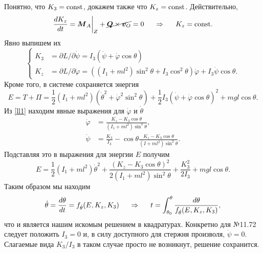 Понятно, что $K_3 = \text{const}$, докажем также что $K_z = \text{const}$. Действительно,
\begin{equation*}
    \frac{d K_z}{d t} = {\mbox{\boldmath $M$}_A}\bigg|_Z + \cancel{\mbox{\boldmath $Q$} \times \mbox{\boldmath $v$}_O} = 0
    \hspace{0.5cm} \Rightarrow \hspace{0.5cm} 
    K_z = \text{const}.
\end{equation*}
Явно выпишем их
\begin{equation}
\label{ll1}
    \left\{\begin{aligned}
        K_3 &= {\partial L}/{\partial \dot{\psi}} = I_3\left(\dot{\psi} + \dot{\varphi} \cos \theta\right) \\
        K_z &= {\partial L}/{\partial \dot{\varphi}} = 
        \left((I_1+ml^2) \sin^2 \theta + I_3 \cos^2 \theta\right) \dot{\varphi} + I_3 \dot{\psi} \cos \theta.
    \end{aligned}\right.
\end{equation}
Кроме того, в системе сохраняется энергия
\begin{equation*}
    E = T + \Pi = \frac{1}{2} (I_1 + ml^2) \left(\dot{\theta}^2+\dot{\varphi}^2 \sin^2 \theta\right) 
    + \frac{1}{2} I_3 \left(\dot{\psi} + \dot{\varphi} \cos \theta\right)^2 + mgl\cos \theta.
\end{equation*}
Из \eqref{ll1} находим явные выражения для $\dot{\varphi}$ и $\dot{\theta}$ 
\begin{align*}
    \dot{\varphi} &= \frac{K_z - K_3 \cos \theta}{(I_1 + ml^2)\sin^2\theta} ,\\
    \dot{\psi} &= \frac{K_3}{I_3}  - \cos \theta \frac{K_z - K_3 \cos \theta}{(I+ml^2)\sin^2 \theta} .
\end{align*}
Подставляя это в выражения для энергии $E$ получим
\begin{equation}
    E  = \frac{1}{2} (I_1 + ml^2) \dot{\theta}^2 +
    \frac{
        (K_z - K_3 \cos \theta)^2
    }{
        2 (I_1 + ml^2) \sin^2 \theta
    } + \frac{K_3^2}{2I_3} + mgl \cos \theta.
\end{equation}
Таким образом мы находим 
\begin{equation}
    \dot{\theta} = \frac{d \theta}{d t} = f_{\dot{\theta}}(E, K_z, K_3)
    \hspace{0.5cm} \Rightarrow \hspace{0.5cm} 
    t = \int_{\theta_0}^\theta \frac{d \theta}{f_{\dot{\theta}}(E, K_z, K_3)},
\end{equation}
что и является нашим искомым решением в квадратурах. Конкретно для №11.72 следует положить $I_3=0$ и, в силу доступного для стержня произволя, $\dot{\psi}=0$. Слагаемые вида $K_3/I_3$ в таком случае просто не возникнут, решение сохранится.















